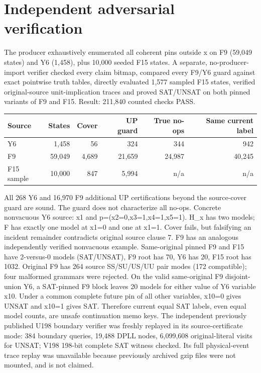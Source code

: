 \documentclass[11pt]{article}
\begin{document}
\section{Independent adversarial verification}
The producer exhaustively enumerated all coherent pins outside x on F9 (59,049 states) and Y6 (1,458), plus 10,000 seeded F15 states. A separate, no-producer-import verifier checked every claim bitmap, compared every F9/Y6 guard against exact pointwise truth tables, directly evaluated 1,577 sampled F15 states, verified original-source unit-implication traces and proved SAT/UNSAT on both pinned variants of F9 and F15. Result: 211,840 counted checks PASS.
\begin{center}\small\begin{tabular}{lrrrrr}\toprule
Source & States & Cover & UP guard & True no-ops & Same current label\\\midrule
Y6 & 1,458 & 56 & 324 & 344 & 942\\
F9 & 59,049 & 4,689 & 21,659 & 24,987 & 40,245\\
F15 sample & 10,000 & 847 & 5,994 & n/a & n/a\\\bottomrule
\end{tabular}\end{center}
All 268 Y6 and 16,970 F9 additional UP certifications beyond the source-cover guard are sound. The guard does not characterize all no-ops. Concrete nonvacuous Y6 source: x1 and p=(x2=0,x3=1,x4=1,x5=1). H_x has two models; F has exactly one model at x1=0 and one at x1=1. Cover fails, but falsifying an incident remainder contradicts original source clause 7. F9 has an analogous independently verified nonvacuous example. Same-original pinned F9 and F15 have 2-versus-0 models (SAT/UNSAT), F9 root has 70, Y6 has 20, F15 root has 1032. Original F9 has 264 source SS/SU/US/UU pair modes (172 compatible); four malformed grammars were rejected.
On the valid same-original F9 disjoint-union Y6, a SAT-pinned F9 block leaves 20 models for either value of Y6 variable x10. Under a common complete future pin of all other variables, x10=0 gives UNSAT and x10=1 gives SAT. Therefore current equal SAT labels, even equal model counts, are unsafe continuation memo keys.
The independent previously published U198 boundary verifier was freshly replayed in its source-certificate mode: 384 boundary queries, 19,488 DPLL nodes, 6,099,608 original-literal visits for UNSAT; V198 198-bit complete SAT witness checked. Its full physical-event trace replay was unavailable because previously archived gzip files were not mounted, and is not claimed.
\end{document}
